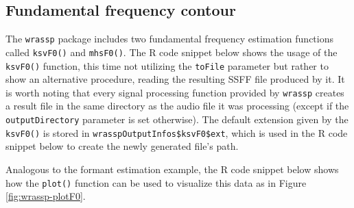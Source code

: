 \documentclass[
]{book}
\newenvironment{Shaded}{\begin{snugshade}}{\end{snugshade}}
\newcommand{\AttributeTok}[1]{\textcolor[rgb]{0.77,0.63,0.00}{#1}}
\newcommand{\CommentTok}[1]{\textcolor[rgb]{0.56,0.35,0.01}{\textit{#1}}}
\newcommand{\DecValTok}[1]{\textcolor[rgb]{0.00,0.00,0.81}{#1}}
\newcommand{\FunctionTok}[1]{\textcolor[rgb]{0.00,0.00,0.00}{#1}}
\newcommand{\NormalTok}[1]{#1}
\newcommand{\OtherTok}[1]{\textcolor[rgb]{0.56,0.35,0.01}{#1}}
\newcommand{\SpecialCharTok}[1]{\textcolor[rgb]{0.00,0.00,0.00}{#1}}
\newcommand{\StringTok}[1]{\textcolor[rgb]{0.31,0.60,0.02}{#1}}
\begin{document}
\hypertarget{subsec:wrassp-f0}{%
\subsection{Fundamental frequency contour}\label{subsec:wrassp-f0}}

The \texttt{wrassp} package includes two fundamental frequency estimation functions called \texttt{ksvF0()} and \texttt{mhsF0()}. The R code snippet below shows the usage of the \texttt{ksvF0()} function, this time not utilizing the \texttt{toFile} parameter but rather to show an alternative procedure, reading the resulting SSFF file produced by it. It is worth noting that every signal processing function provided by \texttt{wrassp} creates a result file in the same directory as the audio file it was processing (except if the \texttt{outputDirectory} parameter is set otherwise). The default extension given by the \texttt{ksvF0()} is stored in \texttt{wrasspOutputInfos\$ksvF0\$ext}, which is used in the R code snippet below to create the newly generated file's path.

\begin{Shaded}
\end{Shaded}

Analogous to the formant estimation example, the R code snippet below shows how the \texttt{plot()} function can be used to visualize this data as in Figure \ref{fig:wrassp-plotF0}.

\begin{Shaded}
\end{Shaded}
\end{document}
